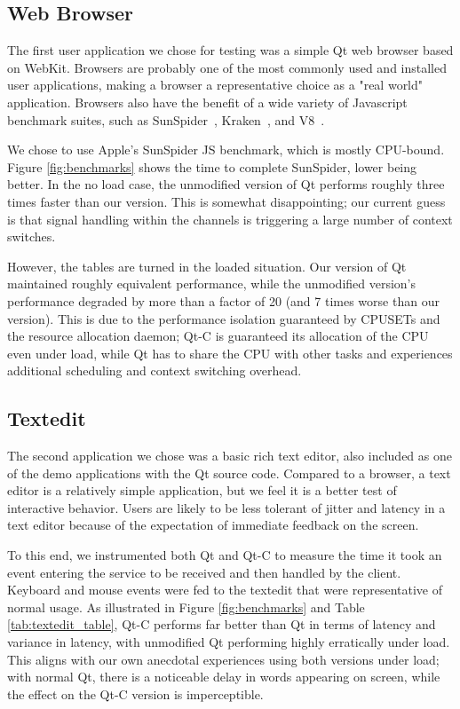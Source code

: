 \documentclass[letterpaper,twocolumn,10pt]{article}
\begin{document}
\subsection{Web Browser}

The first user application we chose for testing was a simple Qt web browser based on WebKit. Browsers are probably one of the most commonly used and installed user applications, making a browser a representative choice as a "real world" application. Browsers also have the benefit of a wide variety of Javascript benchmark suites, such as SunSpider~\cite{sunspider}, Kraken~\cite{kraken}, and V8~\cite{v8benchmark}.

We chose to use Apple's SunSpider JS benchmark, which is mostly CPU-bound. Figure \ref{fig:benchmarks} shows the time to complete SunSpider, lower being better. In the no load case, the unmodified version of Qt performs roughly three times faster than our version. This is somewhat disappointing; our current guess is that signal handling within the channels is triggering a large number of context switches.

However, the tables are turned in the loaded situation. Our version of Qt maintained roughly equivalent performance, while the unmodified version's performance degraded by more than a factor of 20 (and 7 times worse than our version). This is due to the performance isolation guaranteed by CPUSETs and the resource allocation daemon; Qt-C is guaranteed its allocation of the CPU even under load, while Qt has to share the CPU with other tasks and experiences additional scheduling and context switching overhead.

\subsection{Textedit}

The second application we chose was a basic rich text editor, also included as one of the demo applications with the Qt source code. Compared to a browser, a text editor is a relatively simple application, but we feel it is a better test of interactive behavior. Users are likely to be less tolerant of jitter and latency in a text editor because of the expectation of immediate feedback on the screen. 

To this end, we instrumented both Qt and Qt-C to measure the time it took an event entering the service to be received and then handled by the client. Keyboard and mouse events were fed to the textedit that were representative of normal usage. As illustrated in Figure \ref{fig:benchmarks} and Table \ref{tab:textedit_table}, Qt-C performs far better than Qt in terms of latency and variance in latency, with unmodified Qt performing highly erratically under load. This aligns with our own anecdotal experiences using both versions under load; with normal Qt, there is a noticeable delay in words appearing on screen, while the effect on the Qt-C version is imperceptible.
\end{document}
